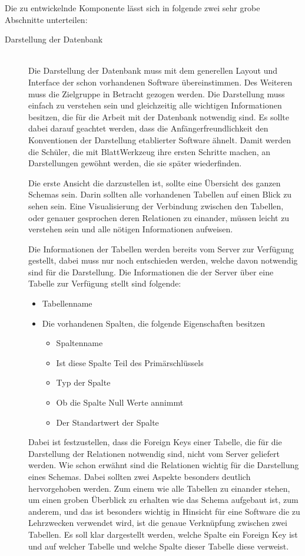 Die zu entwickelnde Komponente lässt sich in folgende zwei sehr grobe Abschnitte unterteilen:
\begin{description}

\item[Darstellung der Datenbank] \hfill\\
Die Darstellung der Datenbank muss mit dem generellen Layout und Interface der schon vorhandenen Software übereinstimmen. Des Weiteren muss die Zielgruppe in Betracht gezogen werden. Die Darstellung muss einfach zu verstehen sein und gleichzeitig alle wichtigen Informationen besitzen, die für die Arbeit mit der Datenbank notwendig sind.
Es sollte dabei darauf geachtet werden, dass die Anfängerfreundlichkeit den Konventionen der Darstellung etablierter Software ähnelt. Damit werden die Schüler, die mit BlattWerkzeug ihre ersten Schritte machen, an Darstellungen gewöhnt werden, die sie später wiederfinden.

Die erste Ansicht die darzustellen ist, sollte eine Übersicht des ganzen Schemas sein. Darin sollten alle vorhandenen Tabellen auf einen Blick zu sehen sein. Eine Visualisierung der Verbindung zwischen den Tabellen, oder genauer gesprochen deren Relationen zu einander, müssen leicht zu verstehen sein und alle nötigen Informationen aufweisen. 

Die Informationen der Tabellen werden bereits vom Server zur Verfügung gestellt, dabei muss nur noch entschieden werden, welche davon notwendig sind für die Darstellung. Die Informationen die der Server über eine Tabelle zur Verfügung stellt sind folgende:
\begin{itemize}
\item Tabellenname
\item Die vorhandenen Spalten, die folgende Eigenschaften besitzen
    \begin{itemize}
    \item Spaltenname
    \item Ist diese Spalte Teil des Primärschlüssels
    \item Typ der Spalte
    \item Ob die Spalte Null Werte annimmt
    \item Der Standartwert der Spalte
    \end{itemize}
\end{itemize}

Dabei ist festzustellen, dass die Foreign Keys einer  Tabelle, die für die Darstellung der Relationen notwendig sind, nicht vom Server geliefert werden.
Wie schon erwähnt sind die Relationen wichtig für die Darstellung eines Schemas. Dabei sollten zwei Aspekte besonders deutlich hervorgehoben werden.
Zum einem wie alle Tabellen zu einander stehen, um einen groben Überblick zu erhalten wie das Schema aufgebaut ist, zum anderem, und das ist besonders wichtig in Hinsicht für eine Software die zu Lehrzwecken verwendet wird, ist die genaue Verknüpfung zwischen zwei Tabellen. Es soll klar dargestellt werden, welche Spalte ein Foreign Key ist und auf welcher Tabelle und welche Spalte dieser Tabelle diese verweist.


\end{description}

